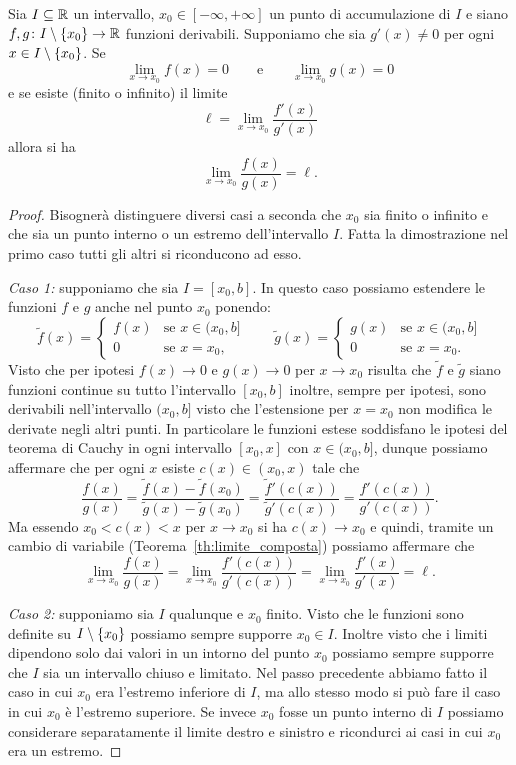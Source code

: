 \begin{theorem}[de l'Hospital $0/0$]
\mymark{***}
Sia $I\subseteq \mathbb R$ un intervallo, $x_0\in [-\infty,+\infty]$ un punto di accumulazione
di $I$
e siano $f,g \colon I\setminus{\left\{ x_0 \right\}} \to \mathbb R$ funzioni derivabili.
Supponiamo che sia $g'(x)\neq 0$ per ogni $x\in I\setminus{\left\{ x_0 \right\}}$.
Se
\[
  \lim_{x\to x_0} f(x) = 0 \qquad \text{e}\qquad \lim_{x\to x_0} g(x) = 0
\]
e se esiste (finito o infinito) il limite
\[
  \ell = \lim_{x\to x_0}\frac{f'(x)}{g'(x)}
\]
allora si ha
\[
  \lim_{x\to x_0} \frac{f(x)}{g(x)} = \ell.
\]
\end{theorem}
%
\begin{proof}
\mymark{**}
Bisognerà distinguere diversi casi a seconda che $x_0$ sia finito o infinito
e che sia un punto interno o un estremo dell'intervallo $I$.
Fatta la dimostrazione nel primo caso tutti gli altri si riconducono ad esso.

\emph{Caso 1:} supponiamo che sia $I=[x_0, b]$. In questo caso possiamo
estendere le funzioni $f$ e $g$ anche nel punto $x_0$ ponendo:
\[
\tilde f(x) =
\begin{cases}
  f(x) & \text{se $x\in (x_0,b]$}\\
  0 & \text{se $x=x_0$,}
\end{cases}
\qquad
\tilde g(x) =
\begin{cases}
  g(x) & \text{se $x\in (x_0,b]$}\\
  0 & \text{se $x=x_0$.}
\end{cases}
\]
Visto che per ipotesi $f(x) \to 0$ e $g(x)\to 0$ per $x\to x_0$ risulta
che $\tilde f$ e $\tilde g$ siano funzioni continue su tutto l'intervallo $[x_0,b]$
inoltre, sempre per ipotesi, sono derivabili nell'intervallo $(x_0,b]$
visto che l'estensione per $x=x_0$ non modifica le derivate negli altri punti.
In particolare le funzioni estese soddisfano le ipotesi del teorema di Cauchy in
ogni intervallo $[x_0,x]$ con $x\in (x_0,b]$, dunque possiamo affermare
che per ogni $x$ esiste $c(x)\in (x_0,x)$ tale che
\[
  \frac{f(x)}{g(x)}
  = \frac{\tilde f(x) - \tilde f(x_0)}
  {\tilde g(x)- \tilde g(x_0)}
  = \frac{\tilde f'(c(x))}{\tilde g'(c(x))}
  = \frac{f'(c(x))}{g'(c(x))}.
\]
Ma essendo $x_0< c(x) < x$ per $x\to x_0$ si ha $c(x)\to x_0$ e quindi,
tramite un cambio di variabile
(Teorema~\ref{th:limite_composta})
possiamo affermare che
\[
    \lim_{x\to x_0} \frac{f(x)}{g(x)}
  = \lim_{x\to x_0}\frac{f'(c(x))}{g'(c(x))}
  = \lim_{x\to x_0}\frac{f'(x)}{g'(x)} = \ell.
\]

\emph{Caso 2:} supponiamo sia $I$ qualunque e $x_0$ finito.
Visto che le funzioni sono definite su $I\setminus{\left\{ x_0 \right\}}$ possiamo sempre
supporre $x_0\in I$. Inoltre
visto che i limiti dipendono solo dai valori in un intorno del punto $x_0$
possiamo sempre supporre che $I$ sia un intervallo chiuso e limitato.
Nel passo precedente abbiamo fatto il caso in cui $x_0$ era l'estremo
inferiore di $I$, ma allo stesso modo si può fare il caso in cui
$x_0$ è l'estremo superiore. Se invece $x_0$ fosse un punto interno di $I$
possiamo considerare separatamente il limite destro e sinistro e ricondurci
ai casi in cui $x_0$ era un estremo.


\end{proof}
